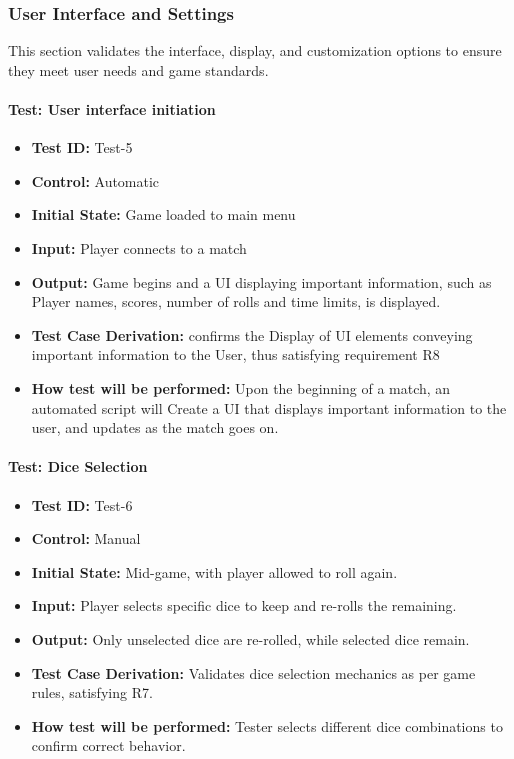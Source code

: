 \documentclass[12pt, titlepage]{article}
\begin{document}
\subsubsection{User Interface and Settings}

This section validates the interface, display, and customization options to ensure they meet user needs and game standards.

\paragraph{Test: User interface initiation}
\begin{itemize}
    \item \textbf{Test ID:} Test-5
    \item \textbf{Control:} Automatic
    \item \textbf{Initial State:} Game loaded to main menu
    \item \textbf{Input:} Player connects to a match
    \item \textbf{Output:} Game begins and a UI displaying important information, such as Player names, scores, number of rolls and time limits, is displayed.
    \item \textbf{Test Case Derivation:} confirms the Display of UI elements conveying important information to the User, thus satisfying requirement R8
    \item \textbf{How test will be performed:} Upon the beginning of a match, an automated script will Create a UI that displays important information to the user, and updates as the match goes on.
\end{itemize}


\paragraph{Test: Dice Selection}
\begin{itemize}
    \item \textbf{Test ID:} Test-6
    \item \textbf{Control:} Manual
    \item \textbf{Initial State:} Mid-game, with player allowed to roll again.
    \item \textbf{Input:} Player selects specific dice to keep and re-rolls the remaining.
    \item \textbf{Output:} Only unselected dice are re-rolled, while selected dice remain.
    \item \textbf{Test Case Derivation:} Validates dice selection mechanics as per game rules, satisfying R7.
    \item \textbf{How test will be performed:} Tester selects different dice combinations to confirm correct behavior.
\end{itemize}
\end{document}
